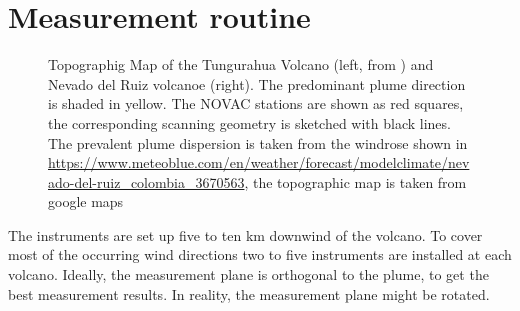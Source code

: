 		\section{Measurement routine}
		\begin{figure}[h]
			\hspace*{-0.8cm}
			\caption{Topographig Map of the Tungurahua Volcano (left, from \cite{hidalgo2015so2}) and Nevado del Ruiz volcanoe (right). The predominant plume direction is shaded in yellow.  The NOVAC stations are shown as red squares, the corresponding scanning geometry is sketched with black lines. The prevalent plume dispersion is taken from the windrose shown in \url{https://www.meteoblue.com/en/weather/forecast/modelclimate/nevado-del-ruiz_colombia_3670563}, the topographic map is taken from google maps}
		\label{fig:maptungurahua2}
	\end{figure}
	
		The instruments are set up five to ten km downwind of the volcano. To cover most of the occurring wind directions two to five instruments are installed at each volcano. Ideally, the measurement plane is orthogonal to the plume, to get the best measurement results. In reality, the measurement plane might be rotated.\\
		
